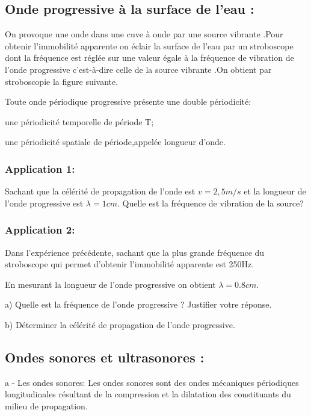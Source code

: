 \documentclass[12pt]{article}
\begin{document}
\subsection{Onde progressive à la surface de l'eau : }

On provoque une onde dans une cuve à onde par une source vibrante .Pour obtenir l'immobilité apparente on éclair la surface de l'eau par un stroboscope dont la fréquence est réglée sur une valeur égale à la fréquence de vibration de l'onde progressive c'est-à-dire celle de la source vibrante .On obtient par stroboscopie la figure suivante.


\begin{tcolorbox}

Toute onde périodique progressive présente une double périodicité:
  
une périodicité temporelle de période T;
  
une périodicité spatiale de période,appelée longueur d'onde.
\end{tcolorbox}

\subsubsection{Application 1:}
Sachant que la célérité de propagation de l’onde est $v=2,5m/s$ et la longueur de l’onde progressive est
$\lambda = 1cm$. Quelle est la fréquence de vibration de la source?


\subsubsection{Application 2:}
Dans l’expérience précédente, sachant que la plus grande fréquence du stroboscope qui permet d’obtenir l’immobilité apparente
est 250Hz.

En mesurant la longueur de l'onde progressive on obtient $\lambda=0.8cm$.

a) Quelle est la fréquence de l’onde progressive ? Justifier votre réponse.

b) Déterminer la célérité de propagation de l’onde progressive.

\subsection{Ondes sonores et ultrasonores : }
\begin{tcolorbox}
a - Les ondes sonores:
Les ondes sonores sont des ondes mécaniques périodiques longitudinales résultant de la compression et la dilatation des
constituants du milieu de propagation.
\end{tcolorbox}
\end{document}
